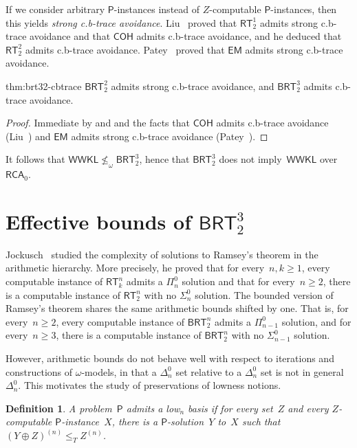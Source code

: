 \documentclass{article}
\newcommand{\Psf}{\mathsf{P}}
\newcommand{\RCA}[0]{\mathsf{RCA}}
\newcommand{\EM}[0]{\mathsf{EM}}
\newcommand{\RT}[0]{\mathsf{RT}}
\newcommand{\COH}[0]{\mathsf{COH}}
\newcommand{\BRT}[0]{\mathsf{BRT}}
\newcommand{\WWKL}[0]{\mathsf{WWKL}}
\numberwithin{theorem}{section}
\newtheorem{definition}[theorem]{Definition}
\begin{document}
If we consider arbitrary $\Psf$-instances instead of $Z$-computable $\Psf$-instances, then this yields \emph{strong c.b-trace avoidance}.
Liu~\cite{liu_cone_2010} proved that $\RT^1_2$ admits strong c.b-trace avoidance and that $\COH$ admits c.b-trace avoidance, and he deduced that $\RT^2_2$ admits c.b-trace avoidance. Patey~\cite{pateycombinatorial} proved that $\EM$ admits strong c.b-trace avoidance. 

\begin{reptheorem}{thm:brt32-cbtrace}
$\BRT^2_2$ admits strong c.b-trace avoidance, and $\BRT^3_2$ admits c.b-trace avoidance.
\end{reptheorem}
\begin{proof}
Immediate by  and  and the facts that $\COH$ admits c.b-trace avoidance (Liu~\cite{liu_cone_2010}) and $\EM$ admits strong c.b-trace avoidance (Patey~\cite{pateycombinatorial}).
\end{proof}

It follows that $\WWKL \not \leq_\omega \BRT^3_2$, hence that $\BRT^3_2$ does not imply~$\WWKL$ over~$\RCA_0$.



\section{Effective bounds of $\BRT^3_2$}

Jockusch~\cite{jockusch_ramseys_1972} studied the complexity of solutions to Ramsey's theorem in the arithmetic hierarchy. More precisely, he proved that for every~$n, k \geq 1$, every computable instance of $\RT^n_k$ admits a $\Pi^0_n$ solution and that for every~$n \geq 2$, there is a computable instance of $\RT^n_2$ with no $\Sigma^0_n$ solution. The bounded version of Ramsey's theorem shares the same arithmetic bounds shifted by one. That is, for every~$n \geq 2$, every computable instance of $\BRT^n_2$ admits a $\Pi^0_{n-1}$ solution, and for every~$n \geq 3$, there is a computable instance of $\BRT^n_2$ with no $\Sigma^0_{n-1}$ solution.

However, arithmetic bounds do not behave well with respect to iterations and constructions of $\omega$-models, in that a $\Delta^0_n$ set relative to a $\Delta^0_n$ set is not in general $\Delta^0_n$. This motivates the study of preservations of lowness notions.

\begin{definition}
A problem~$\Psf$ admits a \emph{low${}_n$ basis} if for every set~$Z$ and every $Z$-computable $\Psf$-instance~$X$, there is a $\Psf$-solution~$Y$ to~$X$ such that $(Y \oplus Z)^{(n)} \leq_T Z^{(n)}$.
\end{definition}
\end{document}
